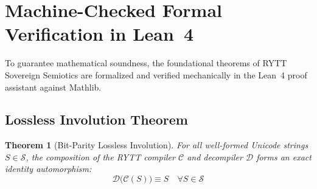 \documentclass[11pt,oneside,letterpaper]{article}
\theoremstyle{sovereignstyle}
\newtheorem{theorem}{Theorem}[section]
\begin{document}
\section{Machine-Checked Formal Verification in Lean~4}

To guarantee mathematical soundness, the foundational theorems of RYTT Sovereign Semiotics are formalized and verified mechanically in the Lean~4 proof assistant against Mathlib.

\subsection{Lossless Involution Theorem}
\begin{theorem}[Bit-Parity Lossless Involution]
For all well-formed Unicode strings $S \in \mathcal{S}$, the composition of the RYTT compiler $\mathcal{C}$ and decompiler $\mathcal{D}$ forms an exact identity automorphism:
\begin{equation}
\mathcal{D}\big(\mathcal{C}(S)\big) \equiv S \quad \forall S \in \mathcal{S}
\end{equation}
\end{theorem}
\end{document}
